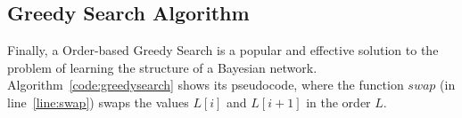 \begin{comment}
Having in consideration all these formulas, we can decompose the score function in order to calculate for one attribute.
	\[ {BIC}( X_i , {Pa}( X_i ) ) = {DLL}( X_i , {Pa}( X_i ) ) + \frac{\log N}{2} {size}( X_i , {Pa}( X_i ) ) \]

Using all the formulas, we can reduce the problem to the following formula:
	\[ G = \max_G \sum_{i=1}^{n} {BIC}( X_i , {Pa}( X_i ) ) = \sum_{i=1}^{n} \max_P {BIC}( X_i , P ) \]

In other words, to get a better network, we need to pick the best set of parents $P$ for each attribute. 
	\[ G = \max_G \sum_{i=1}^{n} {BIC}( X_i , {Pa}( X_i ) ) = \sum_{i=1}^{n} \max_{|P|\leq d} {BIC}( X_i , P ) \]
\end{comment}

\subsection{Greedy Search Algorithm}
\label{subsec:greedysearch}


Finally, a Order-based Greedy Search is a popular and effective solution to the problem of learning the structure of a Bayesian network. Algorithm~\ref{code:greedysearch} shows its pseudocode, where the function ${swap}$ (in line~\ref{line:swap}) swaps the values $L[ i ]$ and $L[ i + 1 ]$ in the order $L$.

